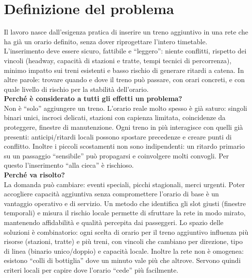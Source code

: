 \documentclass{report}
\begin{document}
\section{Definizione del problema}
Il lavoro nasce dall’esigenza pratica di inserire un treno aggiuntivo in una rete che ha già un orario definito, senza dover riprogettare l’intero timetable. L’inserimento deve essere sicuro, fattibile e “leggero”: niente conflitti, rispetto dei vincoli (headway, capacità di stazioni e tratte, tempi tecnici di percorrenza), minimo impatto sui treni esistenti e basso rischio di generare ritardi a catena.
 In altre parole: trovare quando e dove il treno può passare, con orari concreti, e con quale livello di rischio per la stabilità dell’orario.\\ \textbf{Perché è considerato a tutti gli effetti un problema?} \\
Non è “solo” aggiungere un treno.
L’orario reale molto spesso è già saturo: singoli binari unici, incroci delicati, stazioni con capienza limitata, coincidenze da proteggere, finestre di manutenzione. Ogni treno in più interagisce con quelli già presenti: anticipi/ritardi locali possono spostare precedenze e creare punti di conflitto. Inoltre i piccoli scostamenti non sono indipendenti: un ritardo primario su un passaggio “sensibile” può propagarsi e coinvolgere molti convogli. Per questo l’inserimento “alla cieca” è rischioso. \\ 
\textbf{Perché va risolto?} \\ La domanda può cambiare: eventi speciali, picchi stagionali, merci urgenti. Poter accogliere capacità aggiuntiva senza compromettere l’orario di base è un vantaggio operativo e di servizio. Un metodo che identifica gli slot giusti (finestre temporali) e misura il rischio locale permette di sfruttare la rete in modo mirato, mantenendo affidabilità e qualità percepita dai passeggeri.
Lo spazio delle soluzioni è combinatorio: ogni scelta di orario per il treno aggiuntivo influenza più risorse (stazioni, tratte) e più treni, con vincoli che cambiano per direzione, tipo di linea (binario unico/doppio) e capacità locale. Inoltre la rete non è omogenea: esistono “colli di bottiglia” dove un minuto vale più che altrove. Servono quindi criteri locali per capire dove l’orario “cede” più facilmente.
\end{document}
